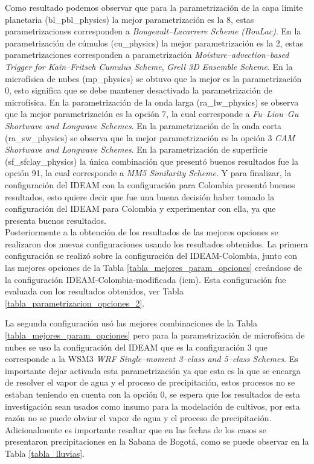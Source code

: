 \begin{itemize}
Como resultado podemos observar que para la parametrización de la capa límite planetaria (bl\_pbl\_physics) la mejor parametrización es la 8, estas parametrizaciones corresponden a \textit{Bougeault–Lacarrere Scheme (BouLac)}. En la parametrización de cúmulos (cu\_physics) la mejor parametrización es la 2, estas parametrizaciones corresponden a parametrización \textit{Moisture–advection–based Trigger for Kain–Fritsch Cumulus Scheme}, \textit{Grell 3D Ensemble Scheme}. En la microfísica de nubes (mp\_physics) se obtuvo que la mejor es la parametrización 0, esto significa que se debe mantener desactivada la parametrización de microfísica. En la parametrización de la onda larga (ra\_lw\_physics) se observa que la mejor parametrización es la opción 7, la cual corresponde a \textit{Fu–Liou–Gu Shortwave and Longwave Schemes}. En la parametrización de la onda corta (ra\_sw\_physics) se observa que la mejor parametrización es la opción 3 \textit{CAM Shortwave and Longwave Schemes}. En la parametrización de superfície (sf\_sfclay\_physics) la única combinación que presentó buenos resultados fue la opción 91, la cual corresponde a \textit{MM5 Similarity Scheme}. Y para finalizar, la configuración del IDEAM con la configuración para Colombia presentó buenos resultados, esto quiere decir que fue una buena decisión haber tomado la configuración del IDEAM para Colombia y experimentar con ella, ya que presenta buenos resultados.\\

Posteriormente a la obtención de los resultados de las mejores opciones se realizaron dos nuevas configuraciones usando los resultados obtenidos. La primera configuración se realizó sobre la configuración del IDEAM-Colombia, junto con las mejores opciones de la Tabla \ref{tabla_mejores_param_opciones} creándose de la configuración IDEAM-Colombia-modificada (icm). Esta configuración fue evaluada con los resultados obtenidos, ver Tabla \ref{tabla_parametrizacion_opciones_2}.

La segunda configuración usó las mejores combinaciones de la Tabla \ref{tabla_mejores_param_opciones} pero para la parametrización de microfísica de nubes se uso la configuración del IDEAM que es la configuración 3 que corresponde a la WSM3 \textit{WRF Single–moment 3–class and 5–class Schemes}. Es importante dejar activada esta parametrización ya que esta es la que se encarga de resolver el vapor de agua y el proceso de precipitación, estos procesos no se estaban teniendo en cuenta con la opción 0, se espera que los resultados de esta investigación sean usados como insumo para la modelación de cultivos, por esta razón no se puede obviar el vapor de agua y el proceso de precipitación. Adicionalmente es importante resaltar que en las fechas de los casos se presentaron precipitaciones en la Sabana de Bogotá, como se puede observar en la Tabla \ref{tabla_lluvias}. \\


\end{itemize}
